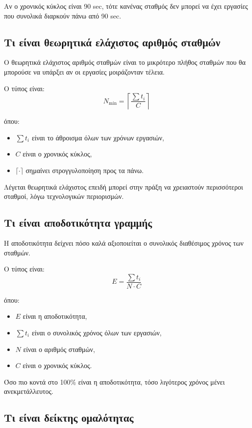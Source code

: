 \documentclass[12pt,a4paper]{article}
\begin{document}
Αν ο χρονικός κύκλος είναι 90 sec, τότε κανένας σταθμός δεν μπορεί να έχει εργασίες που συνολικά διαρκούν πάνω από 90 sec.

\subsection{Τι είναι θεωρητικά ελάχιστος αριθμός σταθμών}

Ο θεωρητικά ελάχιστος αριθμός σταθμών είναι το μικρότερο πλήθος σταθμών που θα μπορούσε να υπάρξει αν οι εργασίες μοιράζονταν τέλεια.

Ο τύπος είναι:
\[
N_{\min}=\left\lceil \frac{\sum t_i}{C} \right\rceil
\]

όπου:

\begin{itemize}
    \item \(\sum t_i\) είναι το άθροισμα όλων των χρόνων εργασιών,
    \item \(C\) είναι ο χρονικός κύκλος,
    \item \(\lceil \cdot \rceil\) σημαίνει στρογγυλοποίηση προς τα πάνω.
\end{itemize}

Λέγεται θεωρητικά ελάχιστος επειδή μπορεί στην πράξη να χρειαστούν περισσότεροι σταθμοί, λόγω τεχνολογικών περιορισμών.

\subsection{Τι είναι αποδοτικότητα γραμμής}

Η αποδοτικότητα δείχνει πόσο καλά αξιοποιείται ο συνολικός διαθέσιμος χρόνος των σταθμών.

Ο τύπος είναι:
\[
E=\frac{\sum t_i}{N\cdot C}
\]

όπου:

\begin{itemize}
    \item \(E\) είναι η αποδοτικότητα,
    \item \(\sum t_i\) είναι ο συνολικός χρόνος όλων των εργασιών,
    \item \(N\) είναι ο αριθμός σταθμών,
    \item \(C\) είναι ο χρονικός κύκλος.
\end{itemize}

Όσο πιο κοντά στο 100\% είναι η αποδοτικότητα, τόσο λιγότερος χρόνος μένει ανεκμετάλλευτος.

\subsection{Τι είναι δείκτης ομαλότητας}
\end{document}
